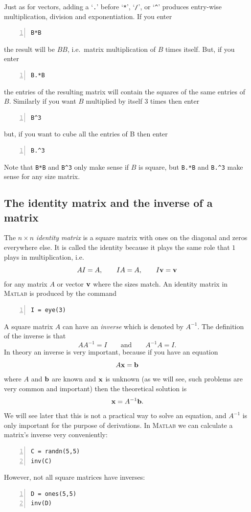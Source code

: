 Just as for vectors, adding a `\verb&.&' before `\verb&*&',
`\verb&/&', or `\verb&^&' produces entry-wise multiplication,
division and exponentiation.
If you enter
\begin{lstlisting}[frame=none,numbers=left]
B*B
\end{lstlisting}
the result will be $BB$, i.e.\ matrix multiplication of $B$ times itself. But,
if you enter
\begin{lstlisting}[frame=none,numbers=left]
B.*B
\end{lstlisting}
the entries of the resulting matrix will contain the squares
of the same entries of $B$. Similarly if you want $B$  multiplied
by itself 3 times then enter
\begin{lstlisting}[frame=none,numbers=left]
B^3
\end{lstlisting}
but, if you want to cube all the entries of B then enter
\begin{lstlisting}[frame=none,numbers=left]
B.^3
\end{lstlisting}
Note that \verb&B*B& and \verb&B^3& only make sense if $B$ is
square, but \verb&B.*B& and \verb&B.^3& make sense for any size
matrix.



\subsection*{The identity matrix and the inverse
of a matrix}

The $n \times n$ {\em identity matrix} is a square matrix with
ones on the diagonal and zeros everywhere else. It is
called the identity because it plays the same role that $1$
plays in multiplication, i.e.
$$
      A I = A,   \qquad I A = A, \qquad I \mathbf{v} = \mathbf{v}
$$
for any matrix $A$ or vector $\mathbf{v}$ where the sizes match.
An identity matrix in \textsc{Matlab} is produced by the command
\begin{lstlisting}[frame=none,numbers=left]
I = eye(3)
\end{lstlisting}

A square matrix $A$ can have an {\em inverse} which is denoted
by $A^{-1}$. The definition of the inverse is that
$$
       A A^{-1} = I  \qquad \text{and} \qquad A^{-1} A = I.
$$
In theory an inverse is very important, because if you
have an equation
$$
     A \mathbf{x} = \mathbf{b}
$$
where $A$ and $\mathbf{b}$ are known and $\mathbf{x}$ is unknown (as
we will see, such problems are very common and important)
then the theoretical solution is
$$
      \mathbf{x} = A^{-1} \mathbf{b}.
$$
We will see later that this is not a practical way to solve
an equation, and $A^{-1}$ is only important for the purpose
of derivations.
%
In \textsc{Matlab} we can calculate a matrix's inverse
very conveniently:
\begin{lstlisting}[frame=none,numbers=left]
C = randn(5,5)
inv(C)
\end{lstlisting}
%
However, not all square matrices have inverses:
\begin{lstlisting}[frame=none,numbers=left]
D = ones(5,5)
inv(D)
\end{lstlisting}


